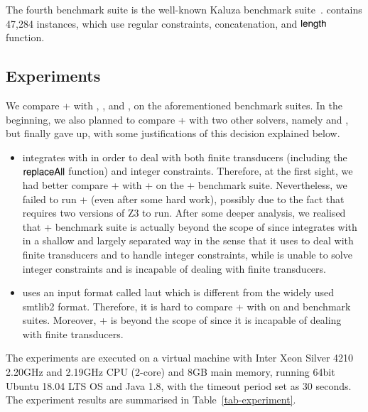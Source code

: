 The fourth benchmark suite {\kaluzabench} is the well-known Kaluza benchmark suite~\cite{Berkeley-JavaScript}.
{\kaluzabench} contains 47,284 instances, which use regular constraints, concatenation, and $\mathsf{length}$ function.





\subsection{Experiments}\label{sec:exp-res}

We compare {\ostrich}+ with {\cvc} \cite{cvc4}, {\zthree} \cite{Z3-str}, and {\zthreetrau} \cite{Z3-trau}, on the aforementioned benchmark suites. In the beginning, we also planned to compare {\ostrich}+ with two other solvers, namely {\trauplus} \cite{AbdullaA+19} and {\slent} \cite{WC+18}, but finally gave up, with some justifications of this decision explained below. 
\begin{itemize}
\item {\trauplus} integrates {\trau} with {\sloth} in order to deal with both finite transducers (including the $\mathsf{replaceAll}$ function) and integer constraints. Therefore, at the first sight, we had better compare {\ostrich}+ with {\trau+} on the {\transducerbench}+ benchmark suite. Nevertheless, we failed to run {\trau+} (even after some hard work), possibly due to the fact that {\trau} requires two versions of Z3 to run.
After some deeper analysis, we realised that {\transducerbench}+ benchmark suite is actually beyond the scope of {\trauplus} since {\trauplus} integrates {\trau} with {\sloth} in a shallow and largely separated way in the sense that it uses {\sloth} to deal with finite transducers and {\trau} to handle integer constraints, while {\sloth} is unable to solve integer constraints and {\trau}  is incapable of dealing with finite transducers.
%
\item {\slent} uses an input format called laut which is different from the widely used smtlib2 format. Therefore, it is hard to compare {\ostrich}+ with {\slent} on {\kaluzabench} and {\pyexbench} benchmark suites. Moreover, {\transducerbench}+ is beyond the scope of {\slent} since it is incapable of dealing with finite transducers.
\end{itemize}

The experiments are executed on a virtual machine with Inter Xeon Silver 4210 2.20GHz and 2.19GHz CPU (2-core) and 8GB main memory, running 64bit Ubuntu 18.04 LTS OS and Java 1.8, with the timeout period set as 30 seconds. The experiment results are summarised in Table~\ref{tab-experiment}.

